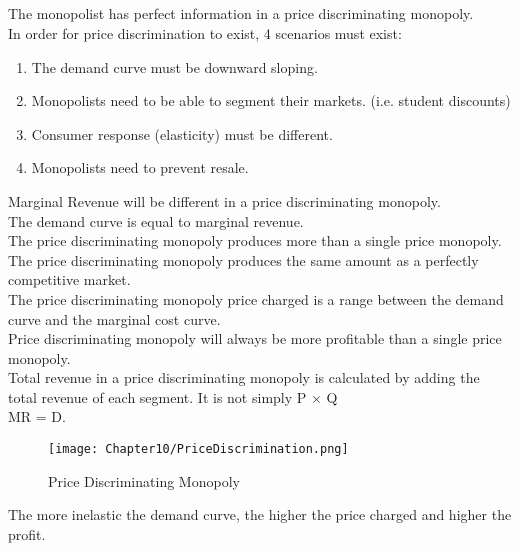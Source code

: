 \subsection{}
The monopolist has perfect information in a price discriminating monopoly.\\
In order for price discrimination to exist, 4 scenarios must exist:
\begin{enumerate}
    \item The demand curve must be downward sloping.
    \item Monopolists need to be able to segment their markets. (i.e. student discounts)
    \item Consumer response (elasticity) must be different.
    \item Monopolists need to prevent resale.
\end{enumerate}
Marginal Revenue will be different in a price discriminating monopoly.\\
The demand curve is equal to marginal revenue.\\
The price discriminating monopoly produces more than a single price monopoly.\\
The price discriminating monopoly produces the same amount as a perfectly competitive market.\\
The price discriminating monopoly price charged is a range between the demand curve and the marginal cost curve.\\
Price discriminating monopoly will always be more profitable than a single price monopoly.\\
Total revenue in a price discriminating monopoly is calculated by adding the total revenue of each segment. It is not simply P $\times$ Q\\
MR = D.
\begin{figure}[H]
    \centering
    \texttt{[image: Chapter10/PriceDiscrimination.png]}
    \caption{Price Discriminating Monopoly}
    \label{fig:pricediscriminating}
\end{figure}
The more inelastic the demand curve, the higher the price charged and higher the profit.\\